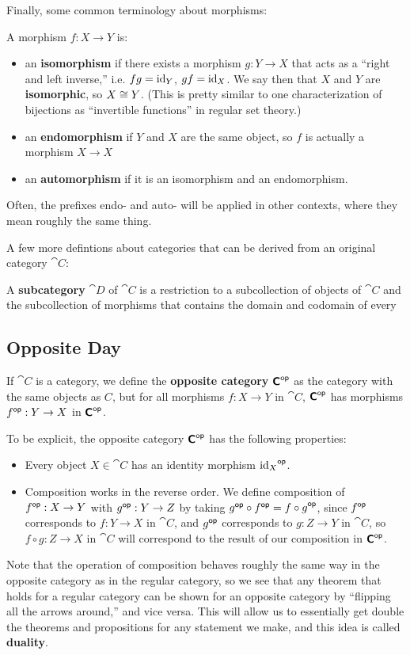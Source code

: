 Finally, some common terminology about morphisms:
\begin{definition}
  A morphism $f : X \to Y$ is:
  \begin{itemize}
    \item an \textbf{isomorphism} if there exists a morphism $g: Y \to X$ that acts as a ``right and left inverse,'' i.e. $fg = \mathrm{id}_Y$, $gf = \mathrm{id}_X$. We say then that $X$ and $Y$ are \textbf{isomorphic}, so $X \cong Y$. (This is pretty similar to one characterization of bijections as ``invertible functions'' in regular set theory.)
    \item an \textbf{endomorphism} if $Y$ and $X$ are the same object, so $f$ is actually a morphism $X \to X$
    \item an \textbf{automorphism} if it is an isomorphism and an endomorphism.
  \end{itemize}
\end{definition}
Often, the prefixes endo- and auto- will be applied in other contexts, where they mean roughly the same thing.

A few more defintions about categories that can be derived from an original category $\cat C$: 
\begin{definition}
A \textbf{subcategory} $\cat D$ of $\cat C$ is a restriction to a subcollection of objects of $\cat C$ and the subcollection of morphisms that contains the domain and codomain of every 
\end{definition}

\subsection{Opposite Day}
\begin{definition}
  If $\cat C$ is a category, we define the \textbf{opposite category} ${\bm{\mathsf{C}}}^{\mathsf{op}}$ as the category with the same objects as $C$, but for all morphisms $f : X \to Y$ in $\cat C$, ${\bm{\mathsf{C}}}^{\mathsf{op}}$ has morphisms ${f}^{\mathsf{op}} : Y \to X$ in ${\bm{\mathsf{C}}}^{\mathsf{op}}$.

  To be explicit, the opposite category ${\bm{\mathsf{C}}}^{\mathsf{op}}$ has the following properties:
  \begin{itemize}
    \item Every object $X \in \cat C$ has an identity morphism ${\mathrm{id}_X}^{\mathsf{op}}$.
    \item Composition works in the reverse order. We define composition of ${f}^{\mathsf{op}} : X \to Y$ with ${g}^{\mathsf{op}} : Y \to Z$ by taking ${g}^{\mathsf{op}} \circ {f}^{\mathsf{op}} =  {f \circ g}^{\mathsf{op}}$, since ${f}^{\mathsf{op}}$ corresponds to $f : Y \to X$ in $\cat C$, and ${g}^{\mathsf{op}}$ corresponds to $g : Z \to Y$ in $\cat C$, so $f \circ g : Z \to X$ in $\cat C$ will correspond to the result of our composition in ${\bm{\mathsf{C}}}^{\mathsf{op}}$.
  \end{itemize}
\end{definition}
Note that the operation of composition behaves roughly the same way in the opposite category as in the regular category, so we see that any theorem that holds for a regular category can be shown for an opposite category by ``flipping all the arrows around,'' and vice versa. This will allow us to essentially get double the theorems and propositions for any statement we make, and this idea is called \textbf{duality}.

